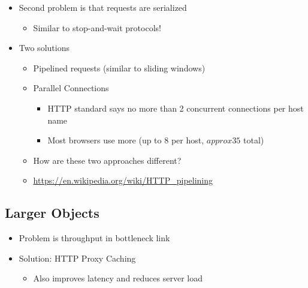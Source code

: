 \begin{itemize}[nosep]
    \item Second problem is that requests are serialized
          \begin{itemize}[nosep]
              \item Similar to stop-and-wait protocols!
          \end{itemize}
    \item Two solutions
          \begin{itemize}[nosep]
              \item Pipelined requests (similar to sliding windows)
              \item Parallel Connections
                    \begin{itemize}[nosep]
                        \item HTTP standard says no more than 2 concurrent connections per host name
                        \item Most browsers use more (up to 8 per host, $approx35$ total)
                    \end{itemize}
              \item How are these two approaches different?
              \item \url{https://en.wikipedia.org/wiki/HTTP_pipelining}
          \end{itemize}
\end{itemize}
\subsection{Larger Objects}
\begin{itemize}
    \item Problem is throughput in bottleneck link
    \item Solution: HTTP Proxy Caching
          \begin{itemize}[nosep]
              \item Also improves latency and reduces server load
          \end{itemize}
\end{itemize}
\begin{figure}[H]
\end{figure}